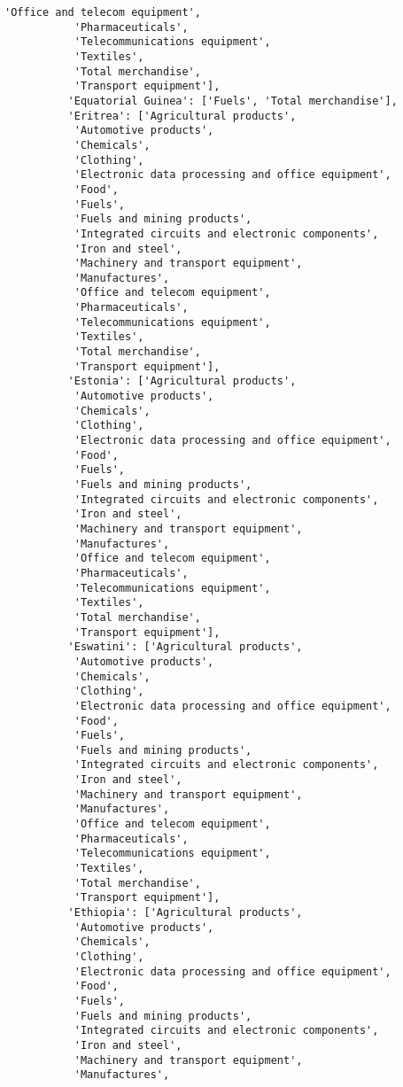 \documentclass[11pt]{article}
\begin{document}
\begin{Verbatim}[commandchars=\\\{\}]
           'Office and telecom equipment',
           'Pharmaceuticals',
           'Telecommunications equipment',
           'Textiles',
           'Total merchandise',
           'Transport equipment'],
          'Equatorial Guinea': ['Fuels', 'Total merchandise'],
          'Eritrea': ['Agricultural products',
           'Automotive products',
           'Chemicals',
           'Clothing',
           'Electronic data processing and office equipment',
           'Food',
           'Fuels',
           'Fuels and mining products',
           'Integrated circuits and electronic components',
           'Iron and steel',
           'Machinery and transport equipment',
           'Manufactures',
           'Office and telecom equipment',
           'Pharmaceuticals',
           'Telecommunications equipment',
           'Textiles',
           'Total merchandise',
           'Transport equipment'],
          'Estonia': ['Agricultural products',
           'Automotive products',
           'Chemicals',
           'Clothing',
           'Electronic data processing and office equipment',
           'Food',
           'Fuels',
           'Fuels and mining products',
           'Integrated circuits and electronic components',
           'Iron and steel',
           'Machinery and transport equipment',
           'Manufactures',
           'Office and telecom equipment',
           'Pharmaceuticals',
           'Telecommunications equipment',
           'Textiles',
           'Total merchandise',
           'Transport equipment'],
          'Eswatini': ['Agricultural products',
           'Automotive products',
           'Chemicals',
           'Clothing',
           'Electronic data processing and office equipment',
           'Food',
           'Fuels',
           'Fuels and mining products',
           'Integrated circuits and electronic components',
           'Iron and steel',
           'Machinery and transport equipment',
           'Manufactures',
           'Office and telecom equipment',
           'Pharmaceuticals',
           'Telecommunications equipment',
           'Textiles',
           'Total merchandise',
           'Transport equipment'],
          'Ethiopia': ['Agricultural products',
           'Automotive products',
           'Chemicals',
           'Clothing',
           'Electronic data processing and office equipment',
           'Food',
           'Fuels',
           'Fuels and mining products',
           'Integrated circuits and electronic components',
           'Iron and steel',
           'Machinery and transport equipment',
           'Manufactures',

\end{Verbatim}
\end{document}
